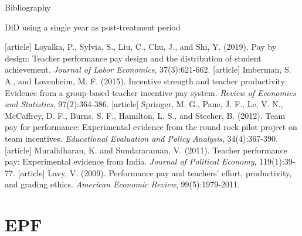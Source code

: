 \documentclass{beamer}
\begin{document}
\begin{frame}[label=Bibliography]{Bibliography}
\vspace{-57pt} \flushright \hyperlink{Mirror}{\beamerbutton{\textcolor{red}{Mirror}}}
\vspace{50pt}
\begin{block}{\centering DiD using a single year as post-treatment period}
\vspace{-17pt} \flushright \hyperlink{Main5}{\beamerbutton{\textcolor{red}{Back}}}
\vspace{5pt}
\begin{thebibliography}{9}
[article]
\tiny {} Loyalka, P., Sylvia, S., Liu, C., Chu, J., and Shi, Y. (2019). Pay by design: Teacher
performance pay design and the distribution of student achievement. \textit{Journal of Labor
Economics}, 37(3):621-662.
[article]
\tiny {} Imberman, S. A., and Lovenheim, M. F. (2015). Incentive strength and teacher productivity: Evidence from a group-based teacher incentive pay system. \textit{Review of Economics and Statistics}, 97(2):364-386.
[article]
\tiny {} Springer, M. G., Pane, J. F., Le, V. N., McCaffrey, D. F., Burns, S. F., Hamilton, L. S., and Stecher, B. (2012). Team pay for performance: Experimental evidence from the round rock pilot project on team incentives. \textit{Educational Evaluation and Policy Analysis}, 34(4):367-390.
[article]
\tiny {} Muralidharan, K. and Sundararaman, V. (2011). Teacher performance pay: Experimental
evidence from India. \textit{Journal of Political Economy}, 119(1):39-77.
[article]
\tiny {} Lavy, V. (2009). Performance pay and teachers' effort, productivity, and grading ethics. \textit{American Economic Review}, 99(5):1979-2011.
\end{thebibliography}
\end{block}
\end{frame}



\section{EPF}
\end{document}
